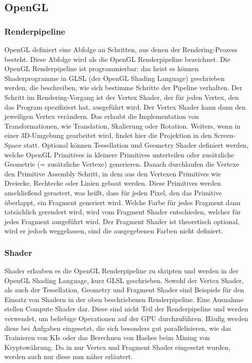 
\subsection{OpenGL}\label{subsec:opengl}

\renewcommand{\kapitelautor}{Autor: Marvin Kurka}

\subsubsection{Renderpipeline}

OpenGL definiert eine Abfolge an Schritten, aus denen der Rendering-Prozess besteht.
Diese Abfolge wird als die OpenGL Renderpipeline bezeichnet.
Die OpenGL Renderpipeline ist programmierbar: das heist es können Shaderprogramme in GLSL (der OpenGL Shading Language)
geschrieben werden, die beschreiben, wie sich bestimme Schritte der Pipeline verhalten.
Der Schritt im Rendering-Vorgang ist der Vertex Shader, der für jeden Vertex, den das Program spezifiziert hat,
ausgeführt wird.
Der Vertex Shader kann dann den jeweiligen Vertex verändern.
Das erlaubt die Implementation von Transformationen, wie Translation, Skalierung oder Rotation.
Weiters, wenn in einer 3D-Umgebung gearbeitet wird, findet hier die Projektion in den Screen-Space statt.
Optional können Tessellation und Geometry Shader definiert werden, welche OpenGL Primitives in kleinere Primitives
unterteilen oder zusätzliche Geometrie (= zusätzliche Vertexe) generieren.
Danach durchlaufen die Vertexe den Primitive Assembly Schritt, in dem aus den Vertexen Primitives wie Dreiecke,
Rechtecke oder Linien gebaut werden.
Diese Primitives werden anschließend gerastert, was heißt, dass für jeden Pixel, den das Primitive überlappt, ein
Fragment generiert wird.
Welche Farbe für jedes Fragment dann tatsächlich gerendert wird, wird vom Fragment Shader entschieden, welcher für jedes
Fragment ausgeführt wird.
Der Fragment Shader ist theoretisch optional, wird er jedoch weggelassen, sind die ausgegebenen Farben nicht definiert.

\subsubsection{Shader}\label{subsubsec:shader}

Shader erlauben es die OpenGL Renderpipeline zu skripten und werden in der OpenGL Shading Language, kurz GLSL
geschrieben.
Sowohl der Vertex Shader, als auch der Tessellation, Geometry und Fragment Shader sind Beispiele für den Einsatz von
Shadern in der oben beschriebenen Renderpipeline.
Eine Ausnahme stellen Compute Shader dar.
Diese sind nicht Teil der Renderpipeline und werden verwendet, um beliebige Operationen auf der GPU durchzuführen.
Häufig werden diese bei Aufgaben eingesetzt, die sich besonders gut parallelisieren, wie das Trainieren von KIs oder
das Berechnen von Hashes \zB beim Mining von Kryptowährung.
Da in \FF nur Vertex und Fragment Shader eingesetzt wurden, werden auch nur diese nun näher erläutert.

